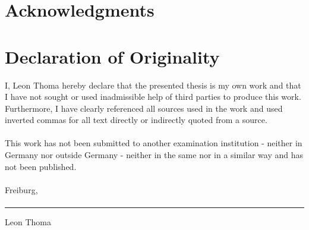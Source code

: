\documentclass[12pt,a4paper]{article}
\begin{document}
\section{Acknowledgments}
\newpage
\section*{Declaration of Originality}
I, Leon Thoma hereby declare that the presented thesis is my own work and that I have not sought or used inadmissible help of third parties to produce this work. Furthermore, I have clearly referenced all sources used in the work and used inverted commas for all text directly or indirectly quoted from a source.\paragraph{}
This work has not been submitted to another examination institution - neither in Germany nor outside Germany - neither in the same nor in a similar way and has not been published.\paragraph{}

Freiburg,\paragraph{}

\rule{5cm}{.4pt}\par
Leon Thoma
\newpage
\end{document}
